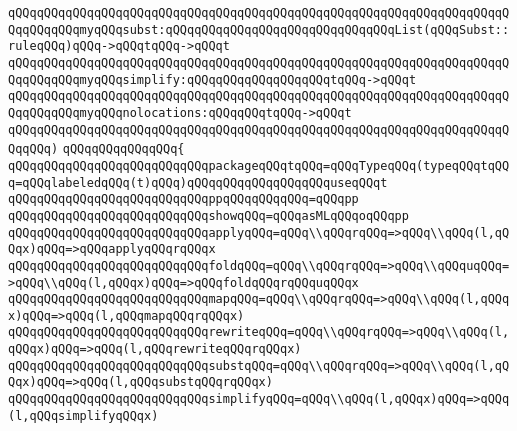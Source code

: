 \verb|qQQqqQQqqQQqqQQqqQQqqQQqqQQqqQQqqQQqqQQqqQQqqQQqqQQqqQQqqQQqqQQqqQQqqQQqqQQqqQQqmyqQQqsubst:qQQqqQQqqQQqqQQqqQQqqQQqqQQqqQQqList(qQQqSubst::ruleqQQq)qQQq->qQQqtqQQq->qQQqt|\newline
\verb|qQQqqQQqqQQqqQQqqQQqqQQqqQQqqQQqqQQqqQQqqQQqqQQqqQQqqQQqqQQqqQQqqQQqqQQqqQQqqQQqmyqQQqsimplify:qQQqqQQqqQQqqQQqqQQqtqQQq->qQQqt|\newline
\verb|qQQqqQQqqQQqqQQqqQQqqQQqqQQqqQQqqQQqqQQqqQQqqQQqqQQqqQQqqQQqqQQqqQQqqQQqqQQqqQQqmyqQQqnolocations:qQQqqQQqtqQQq->qQQqt|\newline
\verb|qQQqqQQqqQQqqQQqqQQqqQQqqQQqqQQqqQQqqQQqqQQqqQQqqQQqqQQqqQQqqQQqqQQqqQQqqQQq)|\newline
\verb|qQQqqQQqqQQqqQQq{|\newline
\verb|qQQqqQQqqQQqqQQqqQQqqQQqqQQqpackageqQQqtqQQq=qQQqTypeqQQq(typeqQQqtqQQq=qQQqlabeledqQQq(t)qQQq)qQQqqQQqqQQqqQQqqQQquseqQQqt|\newline
\verb|qQQqqQQqqQQqqQQqqQQqqQQqqQQqppqQQqqQQqqQQq=qQQqpp|\newline
\verb|qQQqqQQqqQQqqQQqqQQqqQQqqQQqshowqQQq=qQQqasMLqQQqoqQQqpp|\newline
\verb|qQQqqQQqqQQqqQQqqQQqqQQqqQQqapplyqQQq=qQQq\\qQQqrqQQq=>qQQq\\qQQq(l,qQQqx)qQQq=>qQQqapplyqQQqrqQQqx|\newline
\verb|qQQqqQQqqQQqqQQqqQQqqQQqqQQqfoldqQQq=qQQq\\qQQqrqQQq=>qQQq\\qQQquqQQq=>qQQq\\qQQq(l,qQQqx)qQQq=>qQQqfoldqQQqrqQQquqQQqx|\newline
\verb|qQQqqQQqqQQqqQQqqQQqqQQqqQQqmapqQQq=qQQq\\qQQqrqQQq=>qQQq\\qQQq(l,qQQqx)qQQq=>qQQq(l,qQQqmapqQQqrqQQqx)|\newline
\verb|qQQqqQQqqQQqqQQqqQQqqQQqqQQqrewriteqQQq=qQQq\\qQQqrqQQq=>qQQq\\qQQq(l,qQQqx)qQQq=>qQQq(l,qQQqrewriteqQQqrqQQqx)|\newline
\verb|qQQqqQQqqQQqqQQqqQQqqQQqqQQqsubstqQQq=qQQq\\qQQqrqQQq=>qQQq\\qQQq(l,qQQqx)qQQq=>qQQq(l,qQQqsubstqQQqrqQQqx)|\newline
\verb|qQQqqQQqqQQqqQQqqQQqqQQqqQQqsimplifyqQQq=qQQq\\qQQq(l,qQQqx)qQQq=>qQQq(l,qQQqsimplifyqQQqx)|\newline
